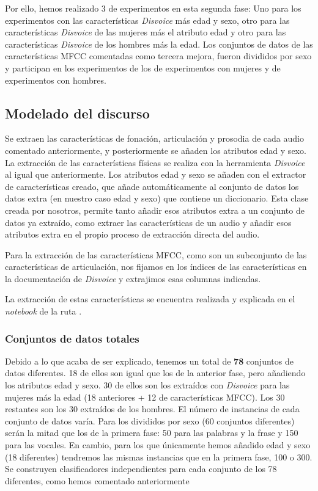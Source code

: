 Por ello, hemos realizado 3  de experimentos en esta segunda fase: Uno para los experimentos con las características \textit{Disvoice} más edad y sexo, otro para las características \textit{Disvoice} de las mujeres más el atributo edad y otro para las características \textit{Disvoice} de los hombres más la edad. Los conjuntos de datos de las características MFCC comentadas como tercera mejora, fueron divididos por sexo y participan en los experimentos de los  de experimentos con mujeres y de experimentos con hombres.


\subsection{Modelado del discurso}
Se extraen las características de fonación, articulación y prosodia de cada audio comentado anteriormente, y posteriormente se añaden los atributos edad y sexo. La extracción de las características físicas se realiza con la herramienta \textit{Disvoice} al igual que anteriormente. Los atributos edad y sexo se añaden con el extractor de características creado, que añade automáticamente al conjunto de datos los datos extra (en nuestro caso edad y sexo) que contiene un diccionario. Esta clase creada por nosotros, permite tanto añadir esos atributos extra a un conjunto de datos ya extraído, como extraer las características de un audio y añadir esos atributos extra en el propio proceso de extracción directa del audio.

Para la extracción de las características MFCC, como son un subconjunto de las características de articulación, nos fijamos en los índices de las características en la documentación de \textit{Disvoice} y extrajimos esas columnas indicadas.

La extracción de estas características se encuentra realizada y explicada en el \textit{notebook} de la ruta .

\subsubsection{Conjuntos de datos totales}
Debido a lo que acaba de ser explicado, tenemos un total de \textbf{78} conjuntos de datos diferentes. 18 de ellos son igual que los de la anterior fase, pero añadiendo los atributos edad y sexo. 30 de ellos son los extraídos con \textit{Disvoice} para las mujeres más la edad (18 anteriores + 12 de características MFCC). Los 30 restantes son los 30 extraídos de los hombres. El número de instancias de cada conjunto de datos varía. Para los divididos por sexo (60 conjuntos diferentes) serán la mitad que los de la primera fase: 50 para las palabras y la frase y 150 para las vocales. En cambio, para los que únicamente hemos añadido edad y sexo (18 diferentes) tendremos las mismas instancias que en la primera fase, 100 o 300. Se construyen clasificadores independientes para cada conjunto de los 78 diferentes, como hemos comentado anteriormente

